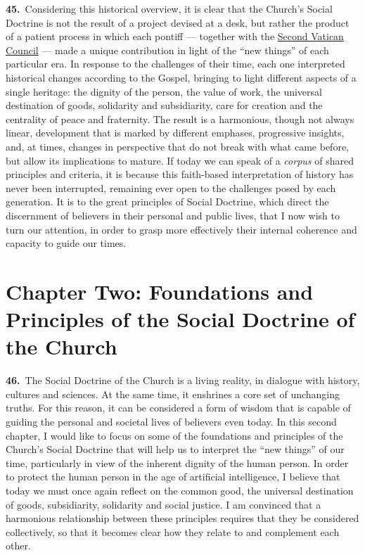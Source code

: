 \documentclass{article}
\begin{document}
\textbf{45.}\ Considering this historical overview, it is clear that the Church's Social Doctrine is not the result of a project devised at a desk, but rather the product of a patient process in which each pontiff --- together with the \href{https://www.vatican.va/archive/hist_councils/ii_vatican_council/index.htm}{Second Vatican Council} --- made a unique contribution in light of the ``new things'' of each particular era. In response to the challenges of their time, each one interpreted historical changes according to the Gospel, bringing to light different aspects of a single heritage: the dignity of the person, the value of work, the universal destination of goods, solidarity and subsidiarity, care for creation and the centrality of peace and fraternity. The result is a harmonious, though not always linear, development that is marked by different emphases, progressive insights, and, at times, changes in perspective that do not break with what came before, but allow its implications to mature. If today we can speak of a \emph{corpus} of shared principles and criteria, it is because this faith-based interpretation of history has never been interrupted, remaining ever open to the challenges posed by each generation. It is to the great principles of Social Doctrine, which direct the discernment of believers in their personal and public lives, that I now wish to turn our attention, in order to grasp more effectively their internal coherence and capacity to guide our times.

\section{Chapter Two: Foundations and Principles of the Social Doctrine of the Church}

\textbf{46.}\ The Social Doctrine of the Church is a living reality, in dialogue with history, cultures and sciences. At the same time, it enshrines a core set of unchanging truths. For this reason, it can be considered a form of wisdom that is capable of guiding the personal and societal lives of believers even today. In this second chapter, I would like to focus on some of the foundations and principles of the Church's Social Doctrine that will help us to interpret the ``new things'' of our time, particularly in view of the inherent dignity of the human person. In order to protect the human person in the age of artificial intelligence, I believe that today we must once again reflect on the common good, the universal destination of goods, subsidiarity, solidarity and social justice. I am convinced that a harmonious relationship between these principles requires that they be considered collectively, so that it becomes clear how they relate to and complement each other.
\end{document}

